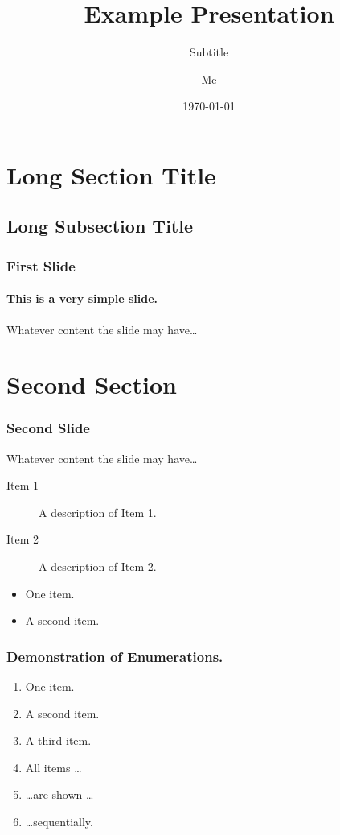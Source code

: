 \documentclass[9pt,aspectratio=169]{beamer}
\title[short title]{Example Presentation}
\subtitle[short subtitle]{Subtitle}
\author[abbreviated name]{Me}
\institute[short name]{Long Institute Name}
\date{\today}
\begin{document}
\frame{\titlepage}


\section[short title]{Long Section Title}
\subsection[short title]{Long Subsection Title}
\begin{frame}                       %
    \frametitle{First Slide}
    \framesubtitle{This is a very simple slide.}
    Whatever content the slide may have\ldots
\end{frame}

\section{Second Section}
\begin{frame}
    \frametitle{Second Slide}
    Whatever content the slide may have\ldots
\end{frame}

\begin{frame}
    \begin{description}
        \item[Item 1] A description of Item 1.
        \item[Item 2] A description of Item 2.
    \end{description}
\end{frame}

\begin{frame}
    \begin{itemize}
        \item One item.
        \item A second item.
    \end{itemize}
\end{frame}

\begin{frame}
    \frametitle{Demonstration of Enumerations.}
    \begin{enumerate}
        \item One item.
            \pause
        \item A second item.
            \pause
        \item A third item.
            \pause
        \item All items \ldots
            \pause
        \item \ldots are shown \ldots
            \pause
        \item \ldots sequentially.
    \end{enumerate}
\end{frame}
\end{document}
